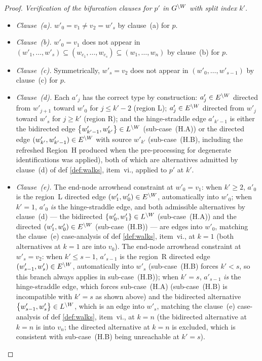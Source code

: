 \documentclass[main]{subfiles}
\begin{document}
\begin{proof}
\emph{Verification of the bifurcation clauses for $p'$ in $G^{\setminus W}$ with split index $k'$.}
\begin{itemize}
    \item \emph{Clause~(a).} $w'_0 = v_1 \ne v_2 = w'_s$ by clause~(a) for $p$.
    \item \emph{Clause~(b).} $w'_0 = v_1$ does not appear in $(w'_1, \dots, w'_s) \subseteq (w_{c_1}, \dots, w_{c_s}) \subseteq (w_1, \dots, w_n)$ by clause~(b) for $p$.
    \item \emph{Clause~(c).} Symmetrically, $w'_s = v_2$ does not appear in $(w'_0, \dots, w'_{s-1})$ by clause~(c) for $p$.
    \item \emph{Clause~(d).} Each $a'_j$ has the correct type by construction: $a'_j \in E^{\setminus W}$ directed from $w'_{j+1}$ toward $w'_0$ for $j \le k' - 2$ (region L); $a'_j \in E^{\setminus W}$ directed from $w'_j$ toward $w'_s$ for $j \ge k'$ (region R); and the hinge-straddle edge $a'_{k' - 1}$ is either the bidirected edge $\left \{ w'_{k' - 1}, w'_{k'} \right \} \in L^{\setminus W}$ (sub-case~(H.A)) or the directed edge $(w'_{k'}, w'_{k' - 1}) \in E^{\setminus W}$ with source $w'_{k'}$ (sub-case~(H.B), including the refreshed Region~H produced when the pre-processing for degenerate identifications was applied), both of which are alternatives admitted by clause~(d) of def \ref{def:walks}, item~vi., applied to $p'$ at $k'$.
    \item \emph{Clause~(e).} The end-node arrowhead constraint at $w'_0 = v_1$: when $k' \ge 2$, $a'_0$ is the region~L directed edge $(w'_1, w'_0) \in E^{\setminus W}$, automatically into $w'_0$; when $k' = 1$, $a'_0$ \emph{is} the hinge-straddle edge, and both admissible alternatives by clause~(d) --- the bidirected $\left \{ w'_0, w'_1 \right \} \in L^{\setminus W}$ (sub-case~(H.A)) and the directed $(w'_1, w'_0) \in E^{\setminus W}$ (sub-case~(H.B)) --- are edges into $w'_0$, matching the clause~(e) case-analysis of def \ref{def:walks}, item~vi., at $k = 1$ (both alternatives at $k = 1$ are into $v_0$). The end-node arrowhead constraint at $w'_s = v_2$: when $k' \le s - 1$, $a'_{s - 1}$ is the region~R directed edge $(w'_{s - 1}, w'_s) \in E^{\setminus W}$, automatically into $w'_s$ (sub-case~(H.B) forces $k' < s$, so this branch always applies in sub-case~(H.B)); when $k' = s$, $a'_{s - 1}$ \emph{is} the hinge-straddle edge, which forces sub-case~(H.A) (sub-case~(H.B) is incompatible with $k' = s$ as shown above) and the bidirected alternative $\left \{ w'_{s - 1}, w'_s \right \} \in L^{\setminus W}$, which is an edge into $w'_s$, matching the clause~(e) case-analysis of def \ref{def:walks}, item~vi., at $k = n$ (the bidirected alternative at $k = n$ is into $v_n$; the directed alternative at $k = n$ is excluded, which is consistent with sub-case~(H.B) being unreachable at $k' = s$).
\end{itemize}


\end{proof}
\end{document}
